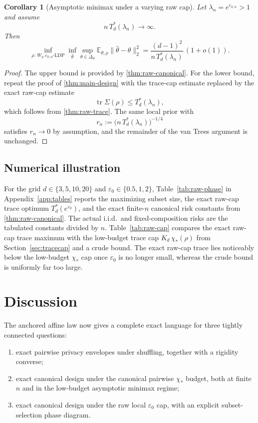 \documentclass[11pt]{amsart}
\newtheorem{corollary}[corollary]{Corollary}
\theoremstyle{definition}
\DeclareMathOperator{\tr}{tr}
\newcommand{\E}{\mathbb E}
\begin{document}
\begin{corollary}[Asymptotic minimax under a varying raw cap]\label{cor:raw-asymptotic}
Let $\lambda_n=e^{\varepsilon_{0,n}}>1$ and assume
\[
n\,T_d^*(\lambda_n)\longrightarrow\infty.
\]
Then
\[
\inf_{\rho:\,W_\rho\ \varepsilon_{0,n}\text{-LDP}}
\inf_{\widehat\theta}
\sup_{\theta\in\Delta_d}
\E_{\theta,\rho}\|\widehat\theta-\theta\|_2^2
=
\frac{(d-1)^2}{n\,T_d^*(\lambda_n)}\,(1+o(1)).
\]
\end{corollary}

\begin{proof}
The upper bound is provided by \cref{thm:raw-canonical}. For the lower bound, repeat the proof of \cref{thm:main-design} with the trace-cap estimate replaced by the exact raw-cap estimate
\[
\tr\Sigma(\rho)\le T_d^*(\lambda_n),
\]
which follows from \cref{thm:raw-trace}. The same local prior with
\[
r_n:=\bigl(n\,T_d^*(\lambda_n)\bigr)^{-1/4}
\]
satisfies $r_n\to 0$ by assumption, and the remainder of the van Trees argument is unchanged.
\end{proof}

\subsection{Numerical illustration}

For the grid $d\in \{3,5,10,20\}$ and $\varepsilon_0\in \{0.5,1,2\}$, Table~\ref{tab:raw-phase} in Appendix~\ref{app:tables} reports the maximizing subset size, the exact raw-cap trace optimum $T_d^*(e^{\varepsilon_0})$, and the exact finite-$n$ canonical risk constants from \cref{thm:raw-canonical}. The actual i.i.d.\ and fixed-composition risks are the tabulated constants divided by $n$. Table~\ref{tab:raw-cap} compares the exact raw-cap trace maximum with the low-budget trace cap $K_d\,\chi_*(\rho)$ from Section~\ref{sec:tracecap} and a crude bound. The exact raw-cap trace lies noticeably below the low-budget $\chi_*$ cap once $\varepsilon_0$ is no longer small, whereas the crude bound is uniformly far too large.



\section{Discussion}\label{sec:discussion}

The anchored affine law now gives a complete exact language for three tightly connected questions:
\begin{enumerate}[label=\textup{(\roman*)}]
\item exact pairwise privacy envelopes under shuffling, together with a rigidity converse;
\item exact canonical design under the canonical pairwise $\chi_*$ budget, both at finite $n$ and in the low-budget asymptotic minimax regime;
\item exact canonical design under the raw local $\varepsilon_0$ cap, with an explicit subset-selection phase diagram.
\end{enumerate}
\end{document}
